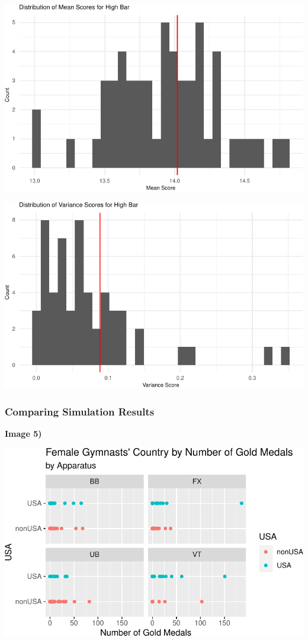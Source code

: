 \documentclass[
  10.5pt,
  letterpaper,
  DIV=11,
  numbers=noendperiod]{scrartcl}
\begin{document}
\includegraphics{Main_files/figure-pdf/scoremeans-var-1.pdf}

\includegraphics{Main_files/figure-pdf/scoremeans-var-2.pdf}

\hypertarget{comparing-simulation-results}{%
\subsubsection{Comparing Simulation
Results}\label{comparing-simulation-results}}

\textbf{Image 5)}

\includegraphics{Main_files/figure-pdf/unnamed-chunk-5-1.pdf}
\end{document}

